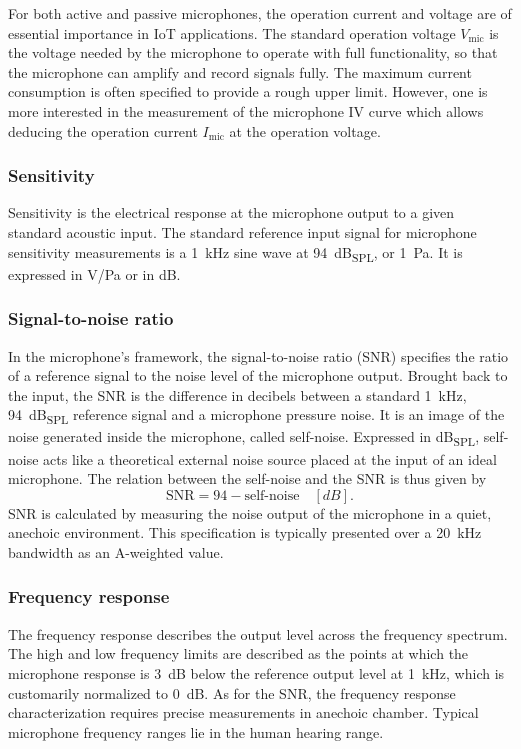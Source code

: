 \documentclass{EPL-master-thesis-covers-EN}
\newcommand{\te}[1]{\textrm{#1}}
\begin{document}
For both active and passive microphones, the operation current and voltage are of essential importance in IoT applications. The standard operation voltage $V_{\te{mic}}$ is the voltage needed by the microphone to operate with full functionality, so that the microphone can amplify and record signals fully. The maximum current consumption is often specified to provide a rough upper limit. However, one is more interested in the measurement of the microphone IV curve which allows deducing the operation current $I_{\te{mic}}$ at the operation voltage.

\subsubsection*{Sensitivity}

Sensitivity is the electrical response at the microphone output to a given standard acoustic input. The standard reference input signal for microphone sensitivity measurements is a \SI{1}{kHz} sine wave at \SI{94}{dB_{SPL}}, or \SI{1}{Pa}. It is expressed in \si{V/Pa} or in \si{dB}.

\subsubsection*{Signal-to-noise ratio}

In the microphone's framework, the signal-to-noise ratio (SNR) specifies the ratio of a reference signal to the noise level of the microphone output. Brought back to the input, the SNR is the difference in decibels between a standard \SI{1}{kHz}, \SI{94}{dB_{SPL}} reference signal and a microphone pressure noise. It is an image of the noise generated inside the microphone, called self-noise. Expressed in \si{dB_{SPL}}, self-noise acts like a theoretical external noise source placed at the input of an ideal microphone. The relation between the self-noise and the SNR is thus given by
\[
 \te{SNR} = 94 - \te{self-noise} \quad \si{[dB]}.
\]
SNR is calculated by measuring the noise output of the microphone in a quiet, anechoic environment. This specification is typically presented over a \SI{20}{kHz} bandwidth as an A-weighted value.

\subsubsection*{Frequency response}

The frequency response describes the output level across the frequency spectrum. The high and low frequency limits are described as the points at which the microphone response is \SI{3}{dB} below the reference output level at \SI{1}{kHz}, which is customarily normalized to \SI{0}{dB}. As for the SNR, the frequency response characterization requires precise measurements in anechoic chamber. Typical microphone frequency ranges lie in the human hearing range.
\end{document}
